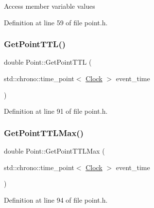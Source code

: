 Access member variable values 

Definition at line 59 of file point.\+h.

\mbox{\label{class_point_a72cf99a391fc3d6ea8f4252f4f92c19f}} 
\subsubsection{\texorpdfstring{Get\+Point\+T\+T\+L()}{GetPointTTL()}}
{\footnotesize\ttfamily double Point\+::\+Get\+Point\+T\+TL (\begin{DoxyParamCaption}\item[{std\+::chrono\+::time\+\_\+point$<$ \hyperlink{universe_8h_a0ef8d951d1ca5ab3cfaf7ab4c7a6fd80}{Clock} $>$}]{event\+\_\+time }\end{DoxyParamCaption})\hspace{0.3cm}{\ttfamily [inline]}}



Definition at line 91 of file point.\+h.

\mbox{\label{class_point_a0800eea77109f6fbb1220b4d551a70d3}} 
\subsubsection{\texorpdfstring{Get\+Point\+T\+T\+L\+Max()}{GetPointTTLMax()}}
{\footnotesize\ttfamily double Point\+::\+Get\+Point\+T\+T\+L\+Max (\begin{DoxyParamCaption}\item[{std\+::chrono\+::time\+\_\+point$<$ \hyperlink{universe_8h_a0ef8d951d1ca5ab3cfaf7ab4c7a6fd80}{Clock} $>$}]{event\+\_\+time }\end{DoxyParamCaption})\hspace{0.3cm}{\ttfamily [inline]}}



Definition at line 94 of file point.\+h.

\mbox{\label{class_point_a61d7e0fb0fd0280f628ea46609082809}} 
